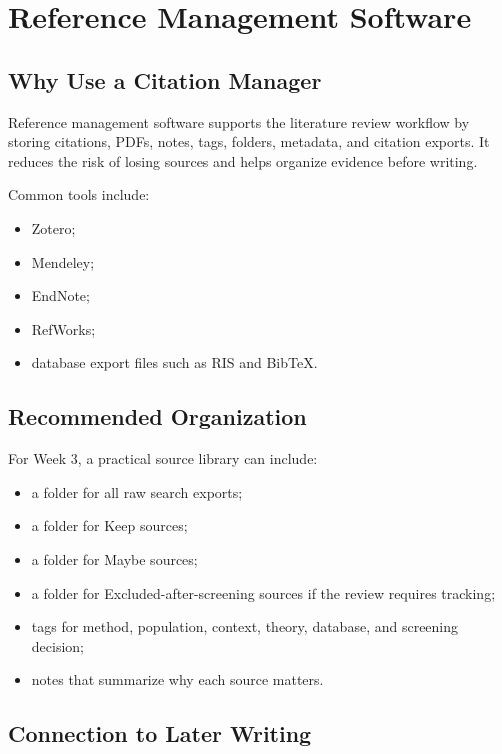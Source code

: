 \documentclass[11pt,letterpaper]{article}
\begin{document}
\section{Reference Management Software}

\subsection{Why Use a Citation Manager}

Reference management software supports the literature review workflow by storing citations, PDFs, notes, tags, folders, metadata, and citation exports. It reduces the risk of losing sources and helps organize evidence before writing.

Common tools include:

\begin{itemize}
  \item Zotero;
  \item Mendeley;
  \item EndNote;
  \item RefWorks;
  \item database export files such as RIS and BibTeX.
\end{itemize}

\subsection{Recommended Organization}

For Week 3, a practical source library can include:

\begin{itemize}
  \item a folder for all raw search exports;
  \item a folder for Keep sources;
  \item a folder for Maybe sources;
  \item a folder for Excluded-after-screening sources if the review requires tracking;
  \item tags for method, population, context, theory, database, and screening decision;
  \item notes that summarize why each source matters.
\end{itemize}

\subsection{Connection to Later Writing}
\end{document}
